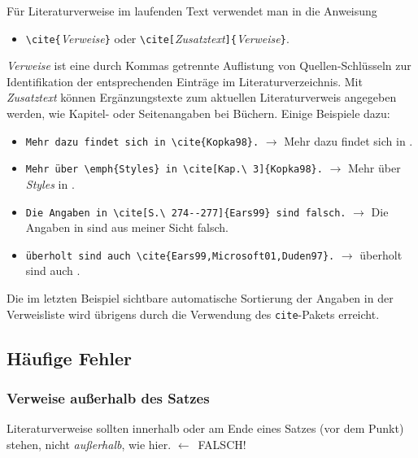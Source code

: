 Für Literaturverweise im laufenden Text verwendet man in \latex die Anweisung
\begin{itemize}
\item[] \verb!\cite{!\textit{Verweise}\verb!}! oder
        \verb!\cite[!\textit{Zusatztext}\verb!]{!\textit{Verweise}\verb!}!.
\end{itemize}

\noindent%
\textit{Verweise} ist eine durch Kommas getrennte Auflistung von Quellen-Schlüsseln
zur Identifikation der entsprechenden Einträge im Literaturverzeichnis.
Mit \textit{Zusatztext} können Ergänzungstexte zum aktuellen Literaturverweis angegeben
werden, wie \zB Kapitel- oder Seitenangaben bei Büchern.
Einige Beispiele dazu:
\begin{itemize}
\item[] \verb!Mehr dazu findet sich in \cite{Kopka98}.! \newline
      $\rightarrow$ Mehr dazu findet sich in \cite{Kopka98}.
\item[] \verb!Mehr über \emph{Styles} in \cite[Kap.\ 3]{Kopka98}.! \newline
      $\rightarrow$ Mehr über \emph{Styles} in \cite[Kap.\ 3]{Kopka98}.
\item[] \verb!Die Angaben in \cite[S.\ 274--277]{Ears99} sind falsch.! \newline
      $\rightarrow$ Die Angaben in \cite[S.\ 274--277]{Ears99} sind aus meiner Sicht falsch.
\item[] \verb!überholt sind auch \cite{Ears99,Microsoft01,Duden97}.! \newline
      $\rightarrow$ überholt sind auch \cite{Ears99,Microsoft01,Duden97}.
\end{itemize}
Die im letzten Beispiel sichtbare automatische Sortierung der Angaben
in der Verweisliste wird übrigens durch die Verwendung des \texttt{cite}-Pakets
erreicht.


\subsection{Häufige Fehler}

\subsubsection{Verweise außerhalb des Satzes}
Literaturverweise sollten innerhalb oder am Ende eines Satzes (vor
dem Punkt) stehen, nicht \emph{außerhalb}, wie
hier. \cite{Oetiker01} $\leftarrow$~FALSCH!

